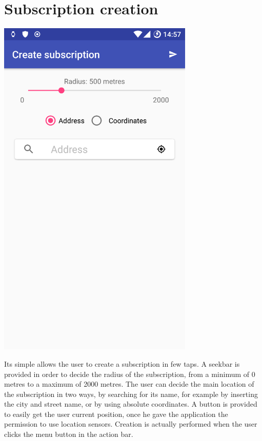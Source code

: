 \documentclass[a4paper]{scrreprt}
\begin{document}
\section{Subscription creation}
\begin{minipage}{0.5\textwidth}
	\centering
	\includegraphics[width=0.7\textwidth]{imgs/subscription_create}
\end{minipage}
\begin{minipage}{0.5\textwidth}
	Its simple allows the user to create a subscription in few taps. A seekbar is provided in order to decide the radius of the subscription, from a minimum of 0 metres to a maximum of 2000 metres. The user can decide the main location of the subscription in two ways, by searching for its name, for example by inserting the city and street name, or by using absolute coordinates. A button is provided to easily get the user current position, once he gave the application the permission to use location sensors. Creation is actually performed when the user clicks the menu button in the action bar.
\end{minipage}
\end{document}
